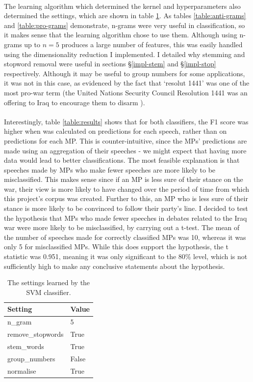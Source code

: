 \documentclass[12pt,a4paper,twoside,openright]{report}
\begin{document}
\\
The learning algorithm which determined the kernel and hyperparameters also determined the settings, which are shown in table \ref{table:settings}. As tables \ref{table:anti-grams} and \ref{table:pro-grams} demonstrate, n-grams were very useful in classification, so it makes sense that the learning algorithm chose to use them. Although using n-grams up to $n = 5$ produces a large number of features, this was easily handled using the dimensionality reduction I implemented. I detailed why stemming and stopword removal were useful in sections \S\ref{impl-stem} and \S\ref{impl-stop} respectively. Although it may be useful to group numbers for some applications, it was not in this case, as evidenced by the fact that `resolut 1441' was one of the most pro-war term (the United Nations Security Council Resolution 1441 was an offering to Iraq to encourage them to disarm \cite{resolution}).
\\\\
Interestingly, table \ref{table:results} shows that for both classifiers, the F1 score was higher when was calculated on predictions for each speech, rather than on predictions for each MP. This is counter-intuitive, since the MPs' predictions are made using an aggregation of their speeches - we might expect that having more data would lead to better classifications. The most feasible explanation is that speeches made by MPs who make fewer speeches are more likely to be misclassified. This makes sense since if an MP is less sure of their stance on the war, their view is more likely to have changed over the period of time from which this project's corpus was created. Further to this, an MP who is less sure of their stance is more likely to be convinced to follow their party's line. I decided to test the hypothesis that MPs who made fewer speeches in debates related to the Iraq war were more likely to be misclassified, by carrying out a t-test. The mean of the number of speeches made for correctly classified MPs was 10, whereas it was only 5 for misclassified MPs. While this does support the hypothesis, the t statistic was 0.951, meaning it was only significant to the 80\% level, which is not sufficiently high to make any conclusive statements about the hypothesis.

\begin{table}[]
	\centering
	\begin{tabular}{ll}
		\hline
		\textbf{Setting}  & \textbf{Value} \\ \hline
		n\_gram           & 5              \\ 
		remove\_stopwords & True           \\
		stem\_words       & True           \\
		group\_numbers    & False          \\
		normalise         & True           \\
		\hline
	\end{tabular}
	\caption{The settings learned by the SVM classifier.}
	\label{table:settings}	
\end{table}
\end{document}
